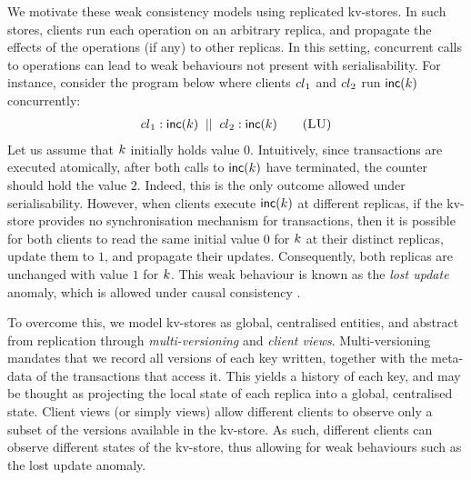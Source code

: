 We motivate these weak consistency models using replicated kv-stores. In
such stores, clients run each operation on an arbitrary replica, and
propagate the effects of the operations (if any) to other
replicas. In this setting, concurrent calls to 
operations can lead to weak behaviours not present with
serialisability.
For instance, consider the program below where clients ${cl}_1$ and 
${cl}_2$  run $\mathsf{inc}(k)$ concurrently: 
\begin{align}
	\cl_1: \ctrinc(\ke)
	\;\; || \;\;
	\cl_2: \ctrinc(\ke)
	\tag{\textsc{LU}}
	\label{prog:inc2}
\end{align}
Let us assume that  $k$ initially holds value $0$.
Intuitively, since transactions are executed atomically, after both
calls to $\mathsf{inc}(k)$ have terminated, the counter should hold 
the value $2$.
Indeed, this is the only outcome allowed under serialisability. 
However, when clients execute $\mathsf{inc}(k)$ at different replicas,
if the kv-store provides no synchronisation mechanism for transactions,
then it is possible for both clients to read the same initial value $0$ for $k$ at their
distinct replicas, update them to $1$, and propagate their updates. Consequently, both
replicas are unchanged with value  $1$ for $k$.
This weak behaviour is known as the \emph{lost update} anomaly, which
is  allowed under causal consistency \cite{cops,wren,redblue}.


To overcome this, we model kv-stores as global, centralised entities, and 
abstract from replication through \emph{multi-versioning} and \emph{client views}. 
Multi-versioning mandates that we record all versions of each key written, 
together with the meta-data of the transactions that access it. 
This yields a history of each key, and may be thought as projecting the local state of each replica into a global, centralised state. 
Client views (or simply views) allow different clients to observe only a subset of the versions available in 
the kv-store.
As such, different clients can observe different states 
of the kv-store, thus allowing for weak behaviours such as the lost update anomaly. 

